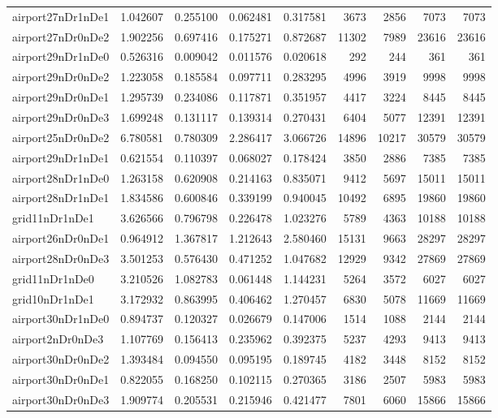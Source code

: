 \begin{longtable}{|l|r|r|r|r|r|r|r|r|}
airport27nDr1nDe1 & 1.042607 & 0.255100 & 0.062481 & 0.317581 & 3673 & 2856 & 7073 & 7073 \\
airport27nDr0nDe2 & 1.902256 & 0.697416 & 0.175271 & 0.872687 & 11302 & 7989 & 23616 & 23616 \\
airport29nDr1nDe0 & 0.526316 & 0.009042 & 0.011576 & 0.020618 & 292 & 244 & 361 & 361 \\
airport29nDr0nDe2 & 1.223058 & 0.185584 & 0.097711 & 0.283295 & 4996 & 3919 & 9998 & 9998 \\
airport29nDr0nDe1 & 1.295739 & 0.234086 & 0.117871 & 0.351957 & 4417 & 3224 & 8445 & 8445 \\
airport29nDr0nDe3 & 1.699248 & 0.131117 & 0.139314 & 0.270431 & 6404 & 5077 & 12391 & 12391 \\
airport25nDr0nDe2 & 6.780581 & 0.780309 & 2.286417 & 3.066726 & 14896 & 10217 & 30579 & 30579 \\
airport29nDr1nDe1 & 0.621554 & 0.110397 & 0.068027 & 0.178424 & 3850 & 2886 & 7385 & 7385 \\
airport28nDr1nDe0 & 1.263158 & 0.620908 & 0.214163 & 0.835071 & 9412 & 5697 & 15011 & 15011 \\
airport28nDr1nDe1 & 1.834586 & 0.600846 & 0.339199 & 0.940045 & 10492 & 6895 & 19860 & 19860 \\
grid11nDr1nDe1 & 3.626566 & 0.796798 & 0.226478 & 1.023276 & 5789 & 4363 & 10188 & 10188 \\
airport26nDr0nDe1 & 0.964912 & 1.367817 & 1.212643 & 2.580460 & 15131 & 9663 & 28297 & 28297 \\
airport28nDr0nDe3 & 3.501253 & 0.576430 & 0.471252 & 1.047682 & 12929 & 9342 & 27869 & 27869 \\
grid11nDr1nDe0 & 3.210526 & 1.082783 & 0.061448 & 1.144231 & 5264 & 3572 & 6027 & 6027 \\
grid10nDr1nDe1 & 3.172932 & 0.863995 & 0.406462 & 1.270457 & 6830 & 5078 & 11669 & 11669 \\
airport30nDr1nDe0 & 0.894737 & 0.120327 & 0.026679 & 0.147006 & 1514 & 1088 & 2144 & 2144 \\
airport2nDr0nDe3 & 1.107769 & 0.156413 & 0.235962 & 0.392375 & 5237 & 4293 & 9413 & 9413 \\
airport30nDr0nDe2 & 1.393484 & 0.094550 & 0.095195 & 0.189745 & 4182 & 3448 & 8152 & 8152 \\
airport30nDr0nDe1 & 0.822055 & 0.168250 & 0.102115 & 0.270365 & 3186 & 2507 & 5983 & 5983 \\
airport30nDr0nDe3 & 1.909774 & 0.205531 & 0.215946 & 0.421477 & 7801 & 6060 & 15866 & 15866 \\

\end{longtable}
